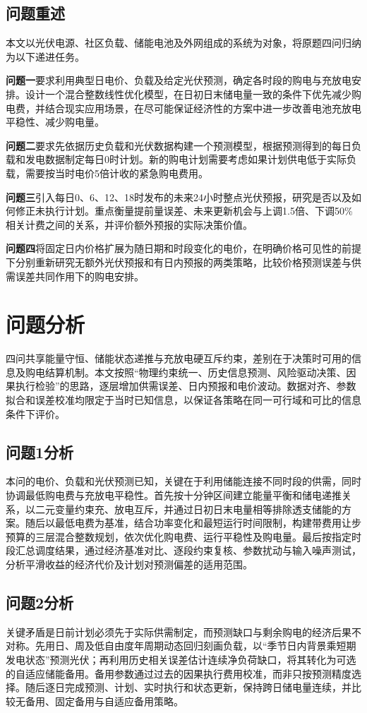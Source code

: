 \documentclass[withoutpreface,bwprint]{cumcmthesis}
\begin{document}
\subsection{问题重述}
本文以光伏电源、社区负载、储能电池及外网组成的系统为对象，将原题四问归纳为以下递进任务。

\textbf{问题一}要求利用典型日电价、负载及给定光伏预测，确定各时段的购电与充放电安排。设计一个混合整数线性优化模型，在日初日末储电量一致的条件下优先减少购电费，并结合现实应用场景，在尽可能保证经济性的方案中进一步改善电池充放电平稳性、减少购电量。

\textbf{问题二}要求先依据历史负载和光伏数据构建一个预测模型，根据预测得到的每日负载和发电数据制定每日0时计划。新的购电计划需要考虑如果计划供电低于实际负载，需要按当时电价5倍计收的紧急购电费用。

\textbf{问题三}引入每日0、6、12、18时发布的未来24小时整点光伏预报，研究是否以及如何修正未执行计划。重点衡量提前量误差、未来更新机会与上调1.5倍、下调50\%相关计费之间的关系，并评价额外预报的实际决策价值。

\textbf{问题四}将固定日内价格扩展为随日期和时段变化的电价，在明确价格可见性的前提下分别重新研究无额外光伏预报和有日内预报的两类策略，比较价格预测误差与供需误差共同作用下的购电安排。


\clearpage
\section{问题分析}
四问共享能量守恒、储能状态递推与充放电硬互斥约束，差别在于决策时可用的信息及购电结算机制。本文按照“物理约束统一、历史信息预测、风险驱动决策、因果执行检验”的思路，逐层增加供需误差、日内预报和电价波动。数据对齐、参数拟合和误差校准均限定于当时已知信息，以保证各策略在同一可行域和可比的信息条件下评价。

\subsection*{问题1分析}
本问的电价、负载和光伏预测已知，关键在于利用储能连接不同时段的供需，同时协调最低购电费与充放电平稳性。首先按十分钟区间建立能量平衡和储电递推关系，以二元变量约束充、放电互斥，并通过日初日末电量相等排除透支储能的方案。随后以最低电费为基准，结合功率变化和最短运行时间限制，构建带费用让步预算的三层混合整数规划，依次优化购电费、运行平稳性及购电量。最后按指定时段汇总调度结果，通过经济基准对比、逐段约束复核、参数扰动与输入噪声测试，分析平滑收益的经济代价及计划对预测偏差的适用范围。

\subsection*{问题2分析}
关键矛盾是日前计划必须先于实际供需制定，而预测缺口与剩余购电的经济后果不对称。先用日、周及低自由度年周期动态回归刻画负载，以“季节日内背景乘短期发电状态”预测光伏；再利用历史相关误差估计连续净负荷缺口，将其转化为可选的自适应储能备用。备用参数通过过去的因果执行费用校准，而非只按预测精度选择。随后逐日完成预测、计划、实时执行和状态更新，保持跨日储电量连续，并比较无备用、固定备用与自适应备用策略。
\end{document}
